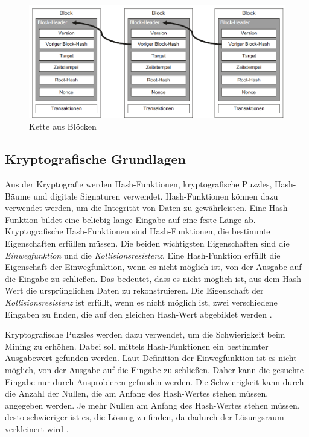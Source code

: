 \begin{figure}[H]
    \centering
    \includegraphics[width=0.9\linewidth]{images/chain_of_blocks.png}
    \caption{Kette aus Blöcken \parencite[S. 12]{Fill_BlockchainGrundlagen}}
    \label{fig:chain_of_blocks}
\end{figure}


\subsection{Kryptografische Grundlagen}
\label{subsec:cryptography_basics}

Aus der Kryptografie werden Hash-Funktionen, kryptografische Puzzles, Hash-Bäume und digitale Signaturen verwendet. Hash-Funktionen können dazu verwendet werden, um die Integrität von Daten zu gewährleisten. Eine Hash-Funktion bildet eine beliebig lange Eingabe auf eine feste Länge ab. Kryptografische Hash-Funktionen sind Hash-Funktionen, die bestimmte Eigenschaften erfüllen müssen. Die beiden wichtigsten Eigenschaften sind die \textit{Einwegfunktion} und die \textit{Kollisionsresistenz}. Eine Hash-Funktion erfüllt die Eigenschaft der Einwegfunktion, wenn es nicht möglich ist, von der Ausgabe auf die Eingabe zu schließen. Das bedeutet, dass es nicht möglich ist, aus dem Hash-Wert die ursprünglichen Daten zu rekonstruieren. Die Eigenschaft der \textit{Kollisionsresistenz} ist erfüllt, wenn es nicht möglich ist, zwei verschiedene Eingaben zu finden, die auf den gleichen Hash-Wert abgebildet werden \parencites[S. 12-13]{Brünnler_BlockchainKurzGut}[S. 6]{Fill_BlockchainGrundlagen}.

Kryptografische Puzzles werden dazu verwendet, um die Schwierigkeit beim Mining zu erhöhen. Dabei soll mittels Hash-Funktionen ein bestimmter Ausgabewert gefunden werden. Laut Definition der Einwegfunktion ist es nicht möglich, von der Ausgabe auf die Eingabe zu schließen. Daher kann die gesuchte Eingabe nur durch Ausprobieren gefunden werden. Die Schwierigkeit kann durch die Anzahl der Nullen, die am Anfang des Hash-Wertes stehen müssen, angegeben werden. Je mehr Nullen am Anfang des Hash-Wertes stehen müssen, desto schwieriger ist es, die Lösung zu finden, da dadurch der Lösungsraum verkleinert wird \parencites[S. 6-7]{Fill_BlockchainGrundlagen}[S. 320]{Antonopoulos_MasteringEthereum}.

